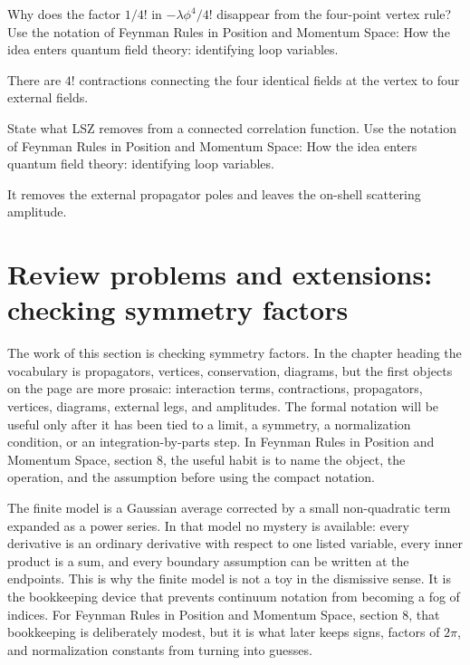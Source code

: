 \begin{exercise}
Why does the factor \(1/4!\) in \(-\lambda\phi^4/4!\) disappear from the four-point vertex rule?  Use the notation of Feynman Rules in Position and Momentum Space: How the idea enters quantum field theory: identifying loop variables.
\begin{answer}
There are \(4!\) contractions connecting the four identical fields at the vertex to four external fields.
\end{answer}
\end{exercise}

\begin{exercise}
State what LSZ removes from a connected correlation function.  Use the notation of Feynman Rules in Position and Momentum Space: How the idea enters quantum field theory: identifying loop variables.
\begin{answer}
It removes the external propagator poles and leaves the on-shell scattering amplitude.
\end{answer}
\end{exercise}



\section{Review problems and extensions: checking symmetry factors}

The work of this section is checking symmetry factors.  In the chapter heading the vocabulary is propagators, vertices, conservation, diagrams, but the first objects on the page are more prosaic: interaction terms, contractions, propagators, vertices, diagrams, external legs, and amplitudes.  The formal notation will be useful only after it has been tied to a limit, a symmetry, a normalization condition, or an integration-by-parts step.  In Feynman Rules in Position and Momentum Space, section 8, the useful habit is to name the object, the operation, and the assumption before using the compact notation.

The finite model is a Gaussian average corrected by a small non-quadratic term expanded as a power series.  In that model no mystery is available: every derivative is an ordinary derivative with respect to one listed variable, every inner product is a sum, and every boundary assumption can be written at the endpoints.  This is why the finite model is not a toy in the dismissive sense.  It is the bookkeeping device that prevents continuum notation from becoming a fog of indices.  For Feynman Rules in Position and Momentum Space, section 8, that bookkeeping is deliberately modest, but it is what later keeps signs, factors of \(2\pi\), and normalization constants from turning into guesses.

